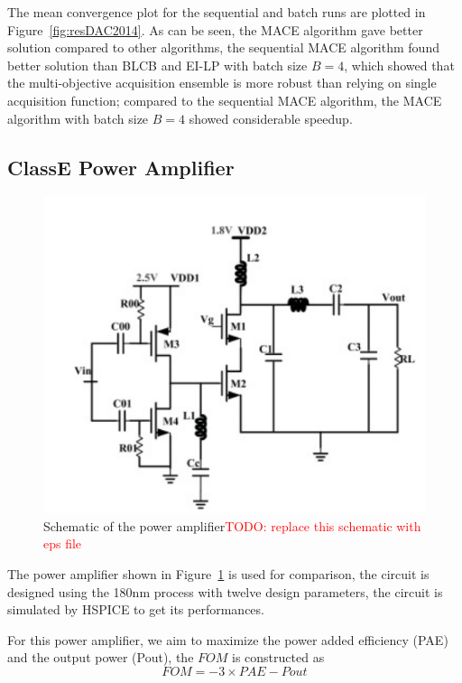 The mean convergence plot for the sequential and batch runs are plotted in
Figure~\ref{fig:resDAC2014}. As can be seen, the MACE algorithm gave better
solution compared to other algorithms, the sequential MACE algorithm found
better solution than BLCB and EI-LP with batch size $B = 4$, which showed that
the multi-objective acquisition ensemble is more robust than relying on single
acquisition function; compared to the sequential MACE algorithm, the MACE
algorithm with batch size $B = 4$ showed considerable speedup.


\subsection{ClassE Power Amplifier}


\begin{figure}[htbp]
    \begin{center}
        \centerline{\includegraphics[width=\columnwidth]{./img/classE.png}}
        \caption{Schematic of the power amplifier\textcolor{red}{TODO: replace this schematic with eps file} }
        \label{fig:schPA}
    \end{center}
\end{figure}

The power amplifier shown in Figure~\ref{fig:schPA} is used for comparison, the
circuit is designed using the 180nm process with twelve design parameters, the
circuit is simulated by HSPICE to get its performances.

For this power amplifier, we aim to maximize the power added efficiency (PAE) and the output power (Pout), the $FOM$ is constructed as
$$
\mathit{FOM} = -3 \times \mathit{PAE} - \mathit{Pout}
$$

